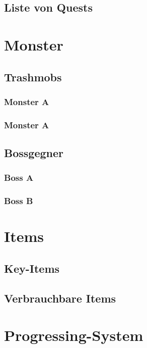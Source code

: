 \documentclass[a4paper,11pt]{article}
\begin{document}
\subsection{Liste von Quests}

\section{Monster}
\subsection{Trashmobs}
\subsubsection{Monster A}
\subsubsection{Monster A}
\subsection{Bossgegner}
\subsubsection{Boss A}
\subsubsection{Boss B}

\section{Items}
\subsection{Key-Items}
\subsection{Verbrauchbare Items}

\section{Progressing-System}
\end{document}
